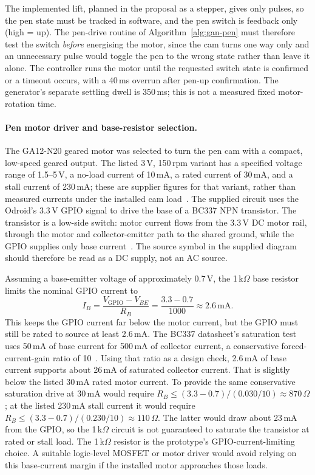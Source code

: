 The implemented lift, planned in the proposal as a stepper, gives only pulses, so the pen state must be tracked in software, and the pen switch is feedback only (high = up). The pen-drive routine of Algorithm~\ref{alg:gan-pen} must therefore test the switch \emph{before} energising the motor, since the cam turns one way only and an unnecessary pulse would toggle the pen to the wrong state rather than leave it alone. The controller runs the motor until the requested switch state is confirmed or a timeout occurs, with a 40\,ms overrun after pen-up confirmation. The generator's separate settling dwell is 350\,ms; this is not a measured fixed motor-rotation time.

\paragraph{Pen motor driver and base-resistor selection.}
The GA12-N20 geared motor was selected to turn the pen cam with a compact, low-speed geared output. The listed 3\,V, 150\,rpm variant has a specified voltage range of 1.5--5\,V, a no-load current of 10\,mA, a rated current of 30\,mA, and a stall current of 230\,mA; these are supplier figures for that variant, rather than measured currents under the installed cam load~\cite{ga12n20ds}. The supplied circuit uses the Odroid's 3.3\,V GPIO signal to drive the base of a BC337 NPN transistor. The transistor is a low-side switch: motor current flows from the 3.3\,V DC motor rail, through the motor and collector-emitter path to the shared ground, while the GPIO supplies only base current~\cite{odroidn2ds}. The source symbol in the supplied diagram should therefore be read as a DC supply, not an AC source.

Assuming a base-emitter voltage of approximately 0.7\,V, the 1\,k$\Omega$ base resistor limits the nominal GPIO current to
\begin{equation}
I_B = \frac{V_{\mathrm{GPIO}}-V_{BE}}{R_B} = \frac{3.3-0.7}{1000} \approx 2.6\,\mathrm{mA}.
\label{eq:pen-bc337-base-current}\label{eq:des-basecurrent}
\end{equation}
This keeps the GPIO current far below the motor current, but the GPIO must still be rated to source at least 2.6\,mA. The BC337 datasheet's saturation test uses 50\,mA of base current for 500\,mA of collector current, a conservative forced-current-gain ratio of 10~\cite{bc337ds}. Using that ratio as a design check, 2.6\,mA of base current supports about 26\,mA of saturated collector current. That is slightly below the listed 30\,mA rated motor current. To provide the same conservative saturation drive at 30\,mA would require $R_B\le(3.3-0.7)/(0.030/10)\approx870\,\Omega$; at the listed 230\,mA stall current it would require $R_B\le(3.3-0.7)/(0.230/10)\approx110\,\Omega$. The latter would draw about 23\,mA from the GPIO, so the 1\,k$\Omega$ circuit is not guaranteed to saturate the transistor at rated or stall load. The 1\,k$\Omega$ resistor is the prototype's GPIO-current-limiting choice. A suitable logic-level MOSFET or motor driver would avoid relying on this base-current margin if the installed motor approaches those loads.

